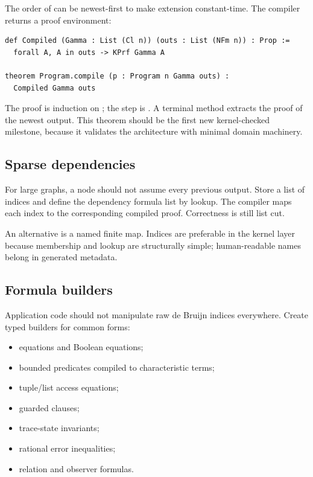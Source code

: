 The order of  can be newest-first to make extension constant-time.
The compiler returns a proof environment:

\begin{lstlisting}[language={}]
def Compiled (Gamma : List (Cl n)) (outs : List (NFm n)) : Prop :=
  forall A, A in outs -> KPrf Gamma A

theorem Program.compile (p : Program n Gamma outs) :
  Compiled Gamma outs
\end{lstlisting}

The proof is induction on ; the step is .  A terminal
method extracts the proof of the newest output.  This theorem should be the
first new kernel-checked milestone, because it validates the architecture with
minimal domain machinery.

\subsection{Sparse dependencies}

For large graphs, a node should not assume every previous output.  Store a list
of indices  and define the dependency
formula list by lookup.  The compiler maps each index to the corresponding
compiled proof.  Correctness is still list cut.

An alternative is a named finite map.  Indices are preferable in the kernel
layer because membership and lookup are structurally simple; human-readable
names belong in generated metadata.

\subsection{Formula builders}

Application code should not manipulate raw de Bruijn indices everywhere.
Create typed builders for common forms:

\begin{itemize}
\item equations and Boolean equations;
\item bounded predicates compiled to characteristic terms;
\item tuple/list access equations;
\item guarded clauses;
\item trace-state invariants;
\item rational error inequalities;
\item relation and observer formulas.
\end{itemize}

